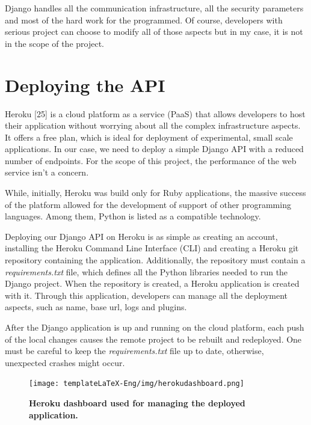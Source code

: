 \documentclass[12pt,a4paper,twoside]{report}
\begin{document}
Django handles all the communication infrastructure, all the security parameters and most of the hard work for the programmed. Of course, developers with serious project can choose to modify all of those aspects but in my case, it is not in the scope of the project.


\section{Deploying the API}
Heroku [25] is a cloud platform as a service (PaaS) that allows developers to host their application without worrying about all the complex infrastructure aspects. It offers a free plan, which is ideal for deployment of experimental, small scale applications. In our case, we need to deploy a simple Django API with a reduced number of endpoints. For the scope of this project, the performance of the web service isn't a concern.

While, initially, Heroku was build only for Ruby applications, the massive success of the platform allowed for the development of support of other programming languages. Among them, Python is listed as a compatible technology.

Deploying our Django API on Heroku is as simple as creating an account, installing the Heroku Command Line Interface (CLI) and creating a Heroku git repository containing the application. Additionally, the repository must contain a \textit{requirements.txt} file, which defines all the Python libraries needed to run the Django project. When the repository is created, a Heroku application is created with it. Through this application, developers can manage all the deployment aspects, such as name, base url, logs and plugins. 

After the Django application is up and running on the cloud platform, each push of the local changes causes the remote project to be rebuilt and redeployed. One must be careful to keep the \textit{requirements.txt} file up to date, otherwise, unexpected crashes might occur.

 \begin{figure}[H]
    \begin{center}
        \texttt{[image: templateLaTeX-Eng/img/herokudashboard.png]}
        \caption{\bf Heroku dashboard used for managing the deployed application.}
    \end{center}
\end{figure}
\end{document}
